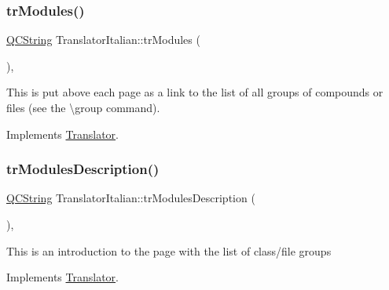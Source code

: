 \mbox{\label{class_translator_italian_a470865fa054fb36f1580244708464b9a}} 
\subsubsection{\texorpdfstring{trModules()}{trModules()}}
{\footnotesize\ttfamily \mbox{\hyperlink{class_q_c_string}{Q\+C\+String}} Translator\+Italian\+::tr\+Modules (\begin{DoxyParamCaption}{ }\end{DoxyParamCaption})\hspace{0.3cm}{\ttfamily [inline]}, {\ttfamily [virtual]}}

This is put above each page as a link to the list of all groups of compounds or files (see the \textbackslash{}group command). 

Implements \mbox{\hyperlink{class_translator}{Translator}}.

\mbox{\label{class_translator_italian_ac376bb383b9b382bbd768e838c9d94e8}} 
\subsubsection{\texorpdfstring{trModulesDescription()}{trModulesDescription()}}
{\footnotesize\ttfamily \mbox{\hyperlink{class_q_c_string}{Q\+C\+String}} Translator\+Italian\+::tr\+Modules\+Description (\begin{DoxyParamCaption}{ }\end{DoxyParamCaption})\hspace{0.3cm}{\ttfamily [inline]}, {\ttfamily [virtual]}}

This is an introduction to the page with the list of class/file groups 

Implements \mbox{\hyperlink{class_translator}{Translator}}.

\mbox{\label{class_translator_italian_a094d4119609a88ad6209b486aab886c4}} 
